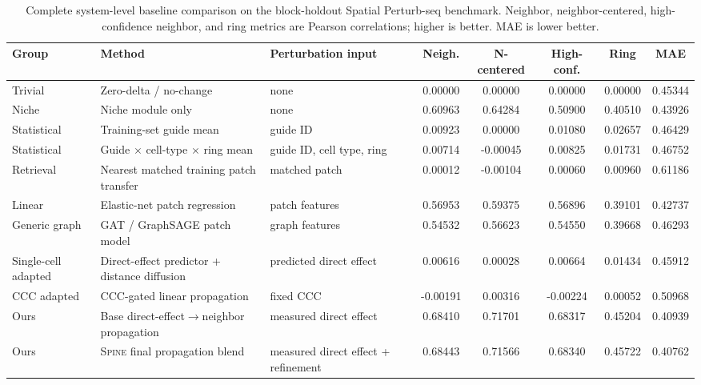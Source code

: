\documentclass[sigconf,review,balance=false]{acmart}
\newcommand{\methodname}{\textsc{Spine}\xspace}
\begin{document}
\begin{table}[t]
\centering
\caption{Complete system-level baseline comparison on the block-holdout Spatial Perturb-seq benchmark. Neighbor, neighbor-centered, high-confidence neighbor, and ring metrics are Pearson correlations; higher is better. MAE is lower better.}
\label{tab:app_full_baseline_comparison}
\footnotesize
\setlength{\tabcolsep}{3pt}
\renewcommand{\arraystretch}{1.12}
\begin{tabularx}{\textwidth}{@{}>{\raggedright\arraybackslash}p{}
>{\raggedright\arraybackslash}X
>{\raggedright\arraybackslash}p{}
ccccc@{}}
\toprule
Group & Method & Perturbation input & Neigh. & N-centered & High-conf. & Ring & MAE \\
\midrule
Trivial &
Zero-delta / no-change &
none &
0.00000 & 0.00000 & 0.00000 & 0.00000 & 0.45344 \\

Niche &
Niche module only &
none &
0.60963 & 0.64284 & 0.50900 & 0.40510 & 0.43926 \\

Statistical &
Training-set guide mean &
guide ID &
0.00923 & 0.00000 & 0.01080 & 0.02657 & 0.46429 \\

Statistical &
Guide $\times$ cell-type $\times$ ring mean &
guide ID, cell type, ring &
0.00714 & -0.00045 & 0.00825 & 0.01731 & 0.46752 \\

Retrieval &
Nearest matched training patch transfer &
matched patch &
0.00012 & -0.00104 & 0.00060 & 0.00960 & 0.61186 \\

Linear &
Elastic-net patch regression &
patch features &
0.56953 & 0.59375 & 0.56896 & 0.39101 & 0.42737 \\

Generic graph &
GAT / GraphSAGE patch model &
graph features &
0.54532 & 0.56623 & 0.54550 & 0.39668 & 0.46293 \\

Single-cell adapted &
Direct-effect predictor + distance diffusion &
predicted direct effect &
0.00616 & 0.00028 & 0.00664 & 0.01434 & 0.45912 \\

CCC adapted &
CCC-gated linear propagation &
fixed CCC &
-0.00191 & 0.00316 & -0.00224 & 0.00052 & 0.50968 \\

Ours &
Base direct-effect$\rightarrow$neighbor propagation &
measured direct effect &
0.68410 & 0.71701 & 0.68317 & 0.45204 & 0.40939 \\

\rowcolor{blue!7}
Ours &
\methodname{} final propagation blend &
measured direct effect + refinement &
0.68443 & 0.71566 & 0.68340 & 0.45722 & 0.40762 \\
\bottomrule
\end{tabularx}
\end{table}
\end{document}
